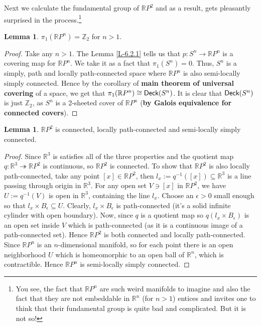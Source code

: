 \documentclass[letterpaper,11pt,twoside]{article}
\theoremstyle{definition}
\theoremstyle{definition}
\theoremstyle{definition}
\theoremstyle{definition}
\newtheorem{lemma}[proposition]{\textbf{Lemma}}
\theoremstyle{definition}
\theoremstyle{definition}
\theoremstyle{remark}
\theoremstyle{definition}
\newcommand{\isom}{\cong}
\newcommand{\R}[0]{\mathbb{R}}
\newcommand{\Z}[0]{\mathbb{Z}}
\newcommand{\RP}[0]{\R P}
\newcommand{\Deck}[1]{{\fontfamily{lmss}\selectfont 
		\text{Deck}(#1)
}}
\begin{document}
Next we calculate the fundamental group of $ \RP^{2} $ and as a result, gets pleasantly surprised in the process.\footnote{You see, the fact that $ \RP^{n} $ are such weird manifolds to imagine and also the fact that they are not embeddable in $ \R^{n} $ (for $ n>1 $) entices and invites one to think that their fundamental group is quite bad and complicated. But it is not so!}
\begin{lemma}\label{L-6.2.2}
	$ \pi_1(\RP^{n}) = \Z_2 $ for $ n>1 $.
\end{lemma}
\begin{proof}
	Take any $ n>1 $. The Lemma \ref{L-6.2.1} tells us that $ p: S^{n} \to \RP^{n} $ is a covering map for $ \RP^{n} $. We take it as a fact that $ \pi_1(S^{n}) =0 $. Thus, $ S^{n} $ is a simply, path and locally path-connected space where $ \RP^{n} $ is also semi-locally simply connected. Hence by the corollary of \textbf{main theorem of universal covering} of a space, we get that $ \pi_1(\RP^{n})  \isom \Deck{S^{n}}$. It is clear that $ \Deck{S^{n}} $ is just $ \Z_2 $, as $ S^{n} $ is a 2-sheeted cover of $ \RP^{n} $ (\textbf{by Galois equivalence for connected covers}).
\end{proof}
\begin{lemma}
	$ \RP^{2} $ is connected, locally path-connected and semi-locally simply connected.
\end{lemma}
\begin{proof}
	 Since $ \R^{3} $ is satisfies all of the three properties and the quotient map $ q : \R^{3} \twoheadrightarrow \RP^{2} $ is continuous, so $ \RP^{2} $ is connected. To show that $ \RP^{2} $ is also locally path-connected, take any point $ [x]\in \RP^{2} $, then $l_x := q^{-1}([x]) \subseteq \R^{3}$ is a line passing through origin in $ \R^{3} $. For any open set $ V\ni [x] $ in $ \RP^{2} $, we have $ U:= q^{-1}(V) $ is open in $ \R^{3} $, containing the line $ l_x $. Choose an $ \epsilon>0 $ small enough so that $ l_x\times B_\epsilon \subseteq U$. Clearly, $ l_x\times B_{\epsilon} $ is path-connected (it's a solid infinite cylinder with open boundary). Now, since $ q $ is a quotient map so $ q(l_x\times B_\epsilon) $ is an open set inside $ V $ which is path-connected (as it is a continuous image of a path-connected set). Hence $ \RP^{2} $ is both connected and locally path-connected. \\
	Since $ \RP^n $ is an $ n $-dimensional manifold, so for each point there is an open neighborhood $ U $ which is homeomorphic to an open ball of $ \R^{n} $, which is contractible. Hence $ \RP^{n} $ is semi-locally simply connected.
\end{proof}
\end{document}
